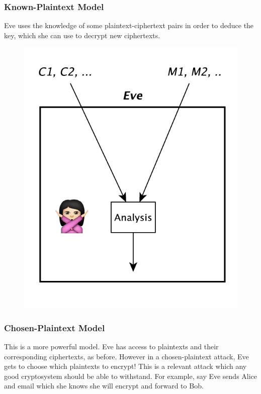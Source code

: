 \documentclass{beamer}
\newcommand{\<}{\langle}
\renewcommand{\>}{\rangle}
\begin{document}
\begin{frame}
\frametitle{Known-Plaintext Model}

Eve uses the knowledge of some plaintext-ciphertext pairs in order to deduce the key, which she can use to decrypt new ciphertexts.

\begin{figure}
\includegraphics[scale=.4]{IMG/attack2.pdf}
\end{figure}
\end{frame}


\begin{frame}
\frametitle{Chosen-Plaintext Model}

This is a more powerful model. Eve has access to plaintexts and their corresponding ciphertexts, as before. However in a chosen-plaintext attack, Eve gets to choose which plaintexts to encrypt! \newline
This is a relevant attack which any good cryptosystem should be able to withstand. For example, say Eve sends Alice and email which she knows she will encrypt and forward to Bob. 
\end{frame}
\end{document}
